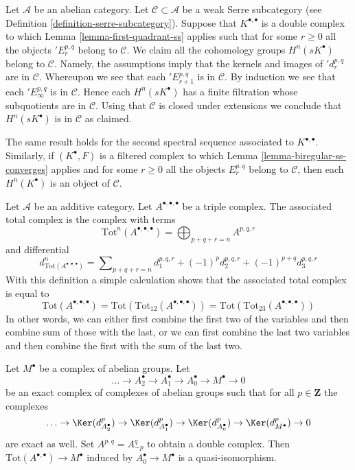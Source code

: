 \begin{remark}
\label{remark-weak-serre-subcategory}
Let $\mathcal{A}$ be an abelian category. Let $\mathcal{C} \subset \mathcal{A}$
be a weak Serre subcategory (see
Definition \ref{definition-serre-subcategory}).
Suppose that $K^{\bullet, \bullet}$ is a double complex to which
Lemma \ref{lemma-first-quadrant-ss}
applies such that for some $r \geq 0$ all the objects
${}'E_r^{p, q}$ belong to $\mathcal{C}$. We claim all the cohomology groups
$H^n(sK^\bullet)$ belong to $\mathcal{C}$. Namely, the assumptions imply
that the kernels and images of ${}'d_r^{p, q}$ are in $\mathcal{C}$.
Whereupon we see that each ${}'E_{r + 1}^{p, q}$ is in $\mathcal{C}$.
By induction we see that each ${}'E_\infty^{p, q}$ is in $\mathcal{C}$.
Hence each $H^n(sK^\bullet)$ has a finite filtration whose subquotients
are in $\mathcal{C}$. Using that $\mathcal{C}$ is closed under extensions
we conclude that $H^n(sK^\bullet)$ is in $\mathcal{C}$ as claimed.

\medskip\noindent
The same result holds for the second spectral sequence associated
to $K^{\bullet, \bullet}$. Similarly, if $(K^\bullet, F)$ is a filtered
complex to which
Lemma \ref{lemma-biregular-ss-converges}
applies and for some $r \geq 0$ all the objects $E_r^{p, q}$
belong to $\mathcal{C}$, then each $H^n(K^\bullet)$ is
an object of $\mathcal{C}$.
\end{remark}

\begin{remark}
\label{remark-triple-complex}
Let $\mathcal{A}$ be an additive category. Let $A^{\bullet, \bullet, \bullet}$
be a triple complex. The associated total complex is the complex with
terms
$$
\text{Tot}^n(A^{\bullet, \bullet, \bullet}) =
\bigoplus\nolimits_{p + q + r = n} A^{p, q, r}
$$
and differential
$$
d^n_{\text{Tot}(A^{\bullet, \bullet, \bullet})} =
\sum\nolimits_{p + q + r = n}
d_1^{p, q, r} + (-1)^pd_2^{p, q, r} + (-1)^{p + q}d_3^{p, q, r}
$$
With this definition a simple calculation shows that the associated total
complex is equal to
$$
\text{Tot}(A^{\bullet, \bullet, \bullet}) =
\text{Tot}(\text{Tot}_{12}(A^{\bullet, \bullet, \bullet})) =
\text{Tot}(\text{Tot}_{23}(A^{\bullet, \bullet, \bullet}))
$$
In other words, we can either first combine the first two of the variables
and then combine sum of those with the last, or we can first combine the
last two variables and then combine the first with the sum of the last two.
\end{remark}

\begin{lemma}
\label{lemma-good-resolution-gives-qis}
Let $M^\bullet$ be a complex of abelian groups. Let
$$
\ldots \to A_2^\bullet \to A_1^\bullet \to A_0^\bullet \to M^\bullet \to 0
$$
be an exact complex of complexes of abelian groups such that for all
$p \in \mathbf{Z}$ the complexes
$$
\ldots \to \Ker(d_{A_2^\bullet}^p) \to \Ker(d_{A_1^\bullet}^p)
\to \Ker(d_{A_0^\bullet}^p) \to \Ker(d_{M^\bullet}^p) \to 0
$$
are exact as well. Set $A^{p, q} = A_{-p}^q$ to obtain a double
complex. Then $\text{Tot}(A^{\bullet, \bullet}) \to M^\bullet$
induced by $A_0^\bullet \to M^\bullet$ is a quasi-isomorphism.
\end{lemma}

